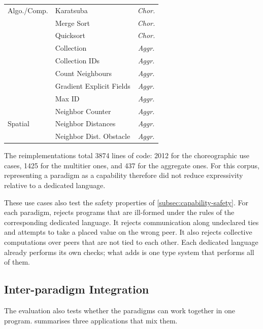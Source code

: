 \begin{table}[t]
\begin{minipage}[t]{0.49\textwidth}
\begin{tabular}[t]{@{}llc@{}}
            Algo./Comp. & Karatsuba & \emph{Chor.} \\
                        & Merge Sort & \emph{Chor.} \\
                        & Quicksort & \emph{Chor.} \\
                        & Collection & \emph{Aggr.} \\
                        & Collection IDs & \emph{Aggr.} \\
                        & Count Neighbours & \emph{Aggr.} \\
                        & Gradient Explicit Fields & \emph{Aggr.} \\
                        & Max ID & \emph{Aggr.} \\
                        & Neighbor Counter & \emph{Aggr.} \\
            \midrule
            Spatial     & Neighbor Distances & \emph{Aggr.} \\
                        & Neighbor Dist. Obstacle & \emph{Aggr.} \\
            \bottomrule
        \end{tabular}
    \end{minipage}
\end{table}

The reimplementations total 3874 lines of \camil code:
2012 for the choreographic use cases, 1425 for the multitier ones, and 437 for the aggregate ones.
%
For this corpus, representing a paradigm as a capability therefore did not reduce expressivity relative to a dedicated language.

These use cases also test the safety properties of \cref{subsec:capability-safety}.
%
For each paradigm, \camil rejects programs that are ill-formed under the rules of the corresponding dedicated language.
It rejects communication along undeclared ties and attempts to take a placed value on the wrong peer.
It also rejects collective computations over peers that are not tied to each other.
%
Each dedicated language already performs its own checks;
what \camil adds is one type system that performs all of them.

\subsection{Inter-paradigm Integration}
\label{subsec:inter-paradigm}

The evaluation also tests whether the paradigms can work together in one program.
%
 summarises three applications that mix them.

